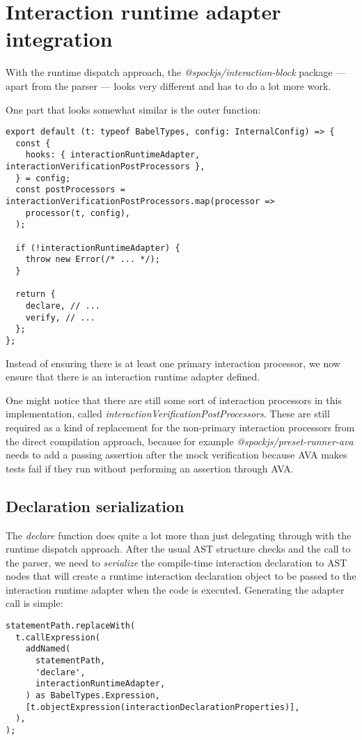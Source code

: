 \section{Interaction runtime adapter integration}
With the runtime dispatch approach,
the \textit{@spockjs/interaction-block} package
--- apart from the parser ---
looks very different and has to do a lot more work.

One part that looks somewhat similar is
the outer function:
\begin{verbatim}
export default (t: typeof BabelTypes, config: InternalConfig) => {
  const {
    hooks: { interactionRuntimeAdapter, interactionVerificationPostProcessors },
  } = config;
  const postProcessors = interactionVerificationPostProcessors.map(processor =>
    processor(t, config),
  );

  if (!interactionRuntimeAdapter) {
    throw new Error(/* ... */);
  }

  return {
    declare, // ...
    verify, // ...
  };
};
\end{verbatim}
Instead of ensuring there is at least one primary interaction processor,
we now ensure that there is an interaction runtime adapter defined.

One might notice that there are still some sort of interaction processors
in this implementation, called \textit{interactionVerificationPostProcessors}.
These are still required as a kind of replacement for
the non-primary interaction processors from the direct compilation approach,
because for example \textit{@spockjs/preset-runner-ava} needs to
add a passing assertion after the mock verification
because AVA makes tests fail if they run without performing an assertion through AVA.

\subsection{Declaration serialization}
The \textit{declare} function does quite a lot more
than just delegating through with the runtime dispatch approach.
After the usual AST structure checks and the call to the parser,
we need to \textit{serialize} the compile-time interaction declaration
to AST nodes that will create a runtime interaction declaration object
to be passed to the interaction runtime adapter when the code is executed.
Generating the adapter call is simple:
\begin{verbatim}
statementPath.replaceWith(
  t.callExpression(
    addNamed(
      statementPath,
      'declare',
      interactionRuntimeAdapter,
    ) as BabelTypes.Expression,
    [t.objectExpression(interactionDeclarationProperties)],
  ),
);
\end{verbatim}

